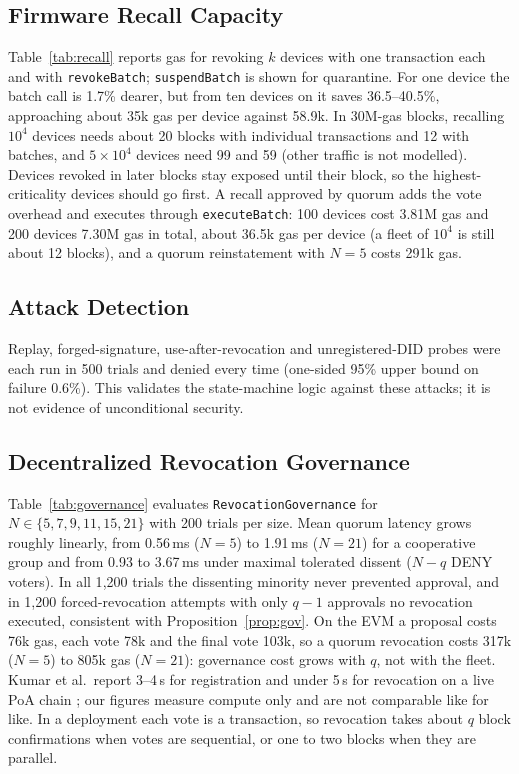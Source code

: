 \subsection{Firmware Recall Capacity}\label{sec:recall_eval}
Table~\ref{tab:recall} reports gas for revoking $k$ devices with one transaction each and with \texttt{revokeBatch}; \texttt{suspendBatch} is shown for quarantine. For one device the batch call is 1.7\% dearer, but from ten devices on it saves 36.5--40.5\%, approaching about 35k gas per device against 58.9k. In 30M-gas blocks, recalling $10^4$ devices needs about 20 blocks with individual transactions and 12 with batches, and $5\times10^4$ devices need 99 and 59 (other traffic is not modelled). Devices revoked in later blocks stay exposed until their block, so the highest-criticality devices should go first. A recall approved by quorum adds the vote overhead and executes through \texttt{executeBatch}: 100 devices cost 3.81M gas and 200 devices 7.30M gas in total, about 36.5k gas per device (a fleet of $10^4$ is still about 12 blocks), and a quorum reinstatement with $N=5$ costs 291k gas.

\begin{table}[t]
\centering
\caption{Gas for recalling devices: one transaction per device versus \texttt{revokeBatch}, and \texttt{suspendBatch}}
\label{tab:recall}
\scriptsize

\end{table}

\subsection{Attack Detection}\label{sec:attacks}
Replay, forged-signature, use-after-revocation and unregistered-DID probes were each run in 500 trials and denied every time (one-sided 95\% upper bound on failure 0.6\%). This validates the state-machine logic against these attacks; it is not evidence of unconditional security.

\subsection{Decentralized Revocation Governance}\label{sec:governance_eval}
Table~\ref{tab:governance} evaluates \texttt{RevocationGovernance} for $N\in\{5,7,9,11,15,21\}$ with 200 trials per size. Mean quorum latency grows roughly linearly, from 0.56\,ms ($N=5$) to 1.91\,ms ($N=21$) for a cooperative group and from 0.93 to 3.67\,ms under maximal tolerated dissent ($N-q$ DENY voters). In all 1{,}200 trials the dissenting minority never prevented approval, and in 1{,}200 forced-revocation attempts with only $q-1$ approvals no revocation executed, consistent with Proposition~\ref{prop:gov}. On the EVM a proposal costs 76k gas, each vote 78k and the final vote 103k, so a quorum revocation costs 317k ($N=5$) to 805k gas ($N=21$): governance cost grows with $q$, not with the fleet. Kumar et al.\ report 3--4\,s for registration and under 5\,s for revocation on a live PoA chain \cite{kumar2026privacy}; our figures measure compute only and are not comparable like for like. In a deployment each vote is a transaction, so revocation takes about $q$ block confirmations when votes are sequential, or one to two blocks when they are parallel.

